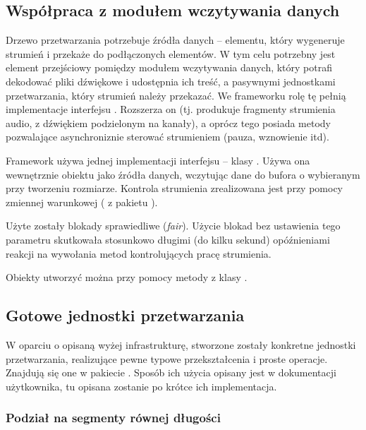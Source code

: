 \subsection{Współpraca z modułem wczytywania danych}

Drzewo przetwarzania potrzebuje źródła danych -- elementu, który wygeneruje strumień i przekaże do
podłączonych elementów. W tym celu potrzebny jest element przejściowy pomiędzy modułem wczytywania
danych, który potrafi dekodować pliki dźwiękowe i udostępnia ich treść, a pasywnymi jednostkami
przetwarzania, który strumień należy przekazać. We frameworku rolę tę pełnią implementacje
interfejsu . Rozszerza on  (tj. produkuje
fragmenty strumienia audio, z dźwiękiem podzielonym na kanały), a oprócz tego posiada metody
pozwalające asynchroniznie sterować strumieniem (pauza, wznowienie itd).

Framework używa jednej implementacji interfejsu  -- klasy
. Używa ona wewnętrznie obiektu  jako źródła danych,
wczytując dane do bufora o wybieranym przy tworzeniu rozmiarze. Kontrola strumienia zrealizowana
jest przy pomocy zmiennej warunkowej ( z pakietu ).

\begin{Note}
  Użyte zostały blokady sprawiedliwe (\textit{fair}). Użycie blokad bez ustawienia tego parametru
  skutkowała stosunkowo długimi (do kilku sekund) opóźnieniami reakcji na wywołania metod
  kontrolujących pracę strumienia.
\end{Note}

Obiekty  utworzyć można przy pomocy metody  z klasy
.


\subsection{Gotowe jednostki przetwarzania}

W oparciu o opisaną wyżej infrastrukturę, stworzone zostały konkretne jednostki przetwarzania,
realizujące pewne typowe przekształcenia i proste operacje. Znajdują się one w pakiecie
. Sposób ich użycia opisany jest w dokumentacji użytkownika, tu
opisana zostanie po krótce ich implementacja.


\subsubsection{Podział na segmenty równej długości}


